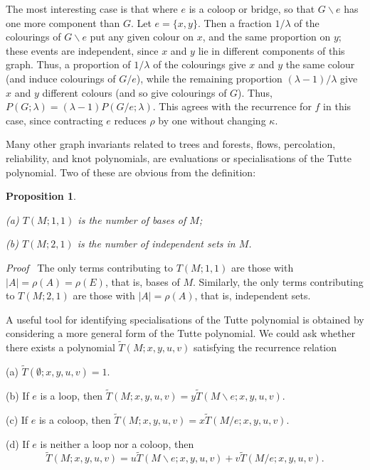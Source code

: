 \documentclass[12pt]{article}
\newtheorem{proposition}[theorem]{Proposition}
\newcommand{\head}[1]{\medbreak\noindent\textit{#1}\ }
\begin{document}
The most interesting case is that where $e$ is a coloop or bridge,
so that $G\backslash e$ has one more component than $G$. Let
$e=\{x,y\}$. Then a fraction $1/\lambda$ of the colourings of
$G\backslash e$ put any given colour on $x$, and the same
proportion on $y$; these events are independent, since $x$ and $y$
lie in different components of this graph. Thus, a proportion
of $1/\lambda$ of the colourings give $x$ and $y$ the same colour
(and induce colourings of $G/e$), while the remaining proportion
$(\lambda-1)/\lambda$ give $x$ and $y$ different colours (and
so give colourings of $G$). Thus, $P(G;\lambda)=(\lambda-1)
P(G/e;\lambda)$. This agrees with the recurrence for $f$ in this
case, since contracting $e$ reduces $\rho$ by one without
changing $\kappa$.

\medbreak

Many other graph invariants related to trees and forests, flows,
percolation, reliability, and knot polynomials, are evaluations or
specialisations of the Tutte polynomial. Two of these are obvious
from the definition:

\begin{proposition}
\begin{description}
\item{(a)} $T(M;1,1)$ is the number of bases of $M$;
\item{(b)} $T(M; 2,1)$ is the number of independent sets in $M$.
\end{description}
\end{proposition}

\head{Proof} The only terms contributing to $T(M;1,1)$ are those with
$|A|=\rho(A)=\rho(E)$, that is, bases of $M$. Similarly, the only
terms contributing to $T(M; 2,1)$ are those with $|A|=\rho(A)$, that
is, independent sets.

\medbreak

A useful tool for identifying specialisations of the Tutte polynomial
is obtained by considering a more general form of
the Tutte polynomial. We could ask whether there exists a polynomial
$\tilde T(M;x,y,u,v)$ satisfying the recurrence relation
\begin{description}
\item{(a)} $\tilde T(\emptyset;x,y,u,v)=1$.
\item{(b)} If $e$ is a loop, then $\tilde T(M;x,y,u,v)=
y\tilde T(M\backslash e;x,y,u,v)$.
\item{(c)} If $e$ is a coloop, then $\tilde T(M;x,y,u,v)=
x\tilde T(M/e;x,y,u,v)$.
\item{(d)} If $e$ is neither a loop nor a coloop, then
\[\tilde T(M;x,y,u,v)=
u\tilde T(M\backslash e;x,y,u,v)+v\tilde T(M/e;x,y,u,v).\]
\end{description}
\end{document}
